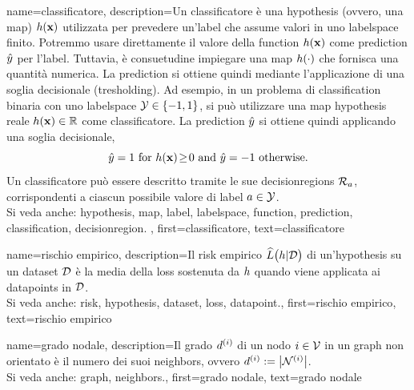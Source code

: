 {name={classificatore},
	description={Un classificatore è una \gls{hypothesis} (ovvero, una \gls{map}) $h({\bf x})$ 
		utilizzata per prevedere un'\gls{label} che assume valori in uno \gls{labelspace} finito. Potremmo usare 
		direttamente il valore della \gls{function} $h({\bf x})$ come \gls{prediction} $\hat{y}$ per 
		l'\gls{label}. Tuttavia, è consuetudine impiegare una \gls{map} $h(\cdot)$ che fornisca una quantità 
		numerica. La \gls{prediction} si ottiene quindi mediante l’applicazione di una soglia decisionale (tresholding). 
		Ad esempio, in un problema di \gls{classification} binaria con uno \gls{labelspace} $\mathcal{Y} \in  \{ -1,1\}$, 
		si può utilizzare una \gls{map} \gls{hypothesis} reale $h({\bf x}) \in \mathbb{R}$ 
		come classificatore. La \gls{prediction} $\hat{y}$ si ottiene quindi applicando una soglia decisionale,  
		 \begin{equation} 
		 	\label{equ_def_threshold_bin_classifier_dict}
		 	\hat{y} =1   \mbox{ for } h({\bf x})\!\geq\!0 \mbox{ and } 	\hat{y} =-1  \mbox{ otherwise.}
	 		\end{equation}
 		Un classificatore può essere descritto tramite le sue \glspl{decisionregion} $\mathcal{R}_{a}$, corrispondenti a ciascun 
		possibile valore di \gls{label} $a \in \mathcal{Y}$.
					\\ 
		Si veda anche: \gls{hypothesis}, \gls{map}, \gls{label}, \gls{labelspace}, \gls{function}, \gls{prediction}, \gls{classification}, \gls{decisionregion}. },
	first={classificatore},
	text={classificatore} 
}


{name={rischio empirico},
  description={Il \gls{risk} empirico $\widehat{L}\big(h|\mathcal{D}\big)$ 
  	di un'\gls{hypothesis} su un \gls{dataset} $\mathcal{D}$ è la media della \gls{loss} sostenuta 
	da $h$ quando viene applicata ai \glspl{datapoint} in $\mathcal{D}$.
				\\ 
		Si veda anche: \gls{risk}, \gls{hypothesis}, \gls{dataset}, \gls{loss}, \gls{datapoint}.},
  first={rischio empirico},
  text={rischio empirico} 
}

{name={grado nodale},
	description={Il grado $d^{(i)}$ di un nodo $i \in \mathcal{V}$ 
		in un \gls{graph} non orientato è il numero dei suoi \gls{neighbors}, ovvero $d^{(i)} := \big|\mathcal{N}^{(i)}\big|$.
					\\ 
		Si veda anche: \gls{graph}, \gls{neighbors}.},
	first={grado nodale},
	text={grado nodale} 
}

